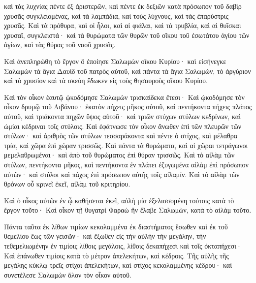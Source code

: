 {καὶ τὰς λυχνίας πέντε ἐξ ἀριστερῶν, καὶ πέντε ἐκ δεξιῶν κατὰ πρόσωπον τοῦ δαβὶρ χρυσᾶς συγκλειομένας, καὶ τὰ λαμπάδια, καὶ τοὺς λύχνους, καὶ τὰς ἐπαρύστρις χρυσᾶς.
Καὶ τὰ πρόθυρα, καὶ οἱ ἧλοι, καὶ αἱ φιάλαι, καὶ τὰ τρυβλία, καὶ αἱ θυΐσκαι χρυσαῖ, συγκλειστά· καὶ τὰ θυρώματα τῶν θυρῶν τοῦ οἴκου τοῦ ἐσωτάτου ἁγίου τῶν ἁγίων, καὶ τὰς θύρας τοῦ ναοῦ χρυσᾶς.
\par }{\PP {}Καὶ ἀνεπληρώθη τὸ ἔργον ὃ ἐποίησε Σαλωμὼν οἴκου Κυρίου· καὶ εἰσήνεγκε Σαλωμὼν τὰ ἅγια Δαυὶδ τοῦ πατρὸς αὐτοῦ, καὶ πάντα τὰ ἅγια Σαλωμὼν, τὸ ἀργύριον καὶ τὸ χρυσίον καὶ τὰ σκεύη ἔδωκεν εἰς τοὺς θησαυροὺς οἴκου Κυρίου.
\par }{\PP {}Καὶ τὸν οἶκον ἑαυτῷ ᾠκοδόμησε Σαλωμὼν τρισκαίδεκα ἔτεσι·
Καὶ ᾠκοδόμησε τὸν οἶκον δρυμῷ τοῦ Λιβάνου· ἑκατὸν πήχεις μῆκος αὐτοῦ, καὶ πεντήκοντα πήχεις πλάτος αὐτοῦ, καὶ τριάκοντα πηχῶν ὕψος αὐτοῦ· καὶ τριῶν στύχων στύλων κεδρίνων, καὶ ὠμίαι κέδριναι τοῖς στύλοις.
Καὶ ἐφάτνωσε τὸν οἶκον ἄνωθεν ἐπὶ τῶν πλευρῶν τῶν στύλων· καὶ ἀριθμὸς τῶν στύλων τεσσαράκοντα καὶ πέντε ὁ στίχος,
καὶ μέλαθρα τρία, καὶ χῶρα ἐπὶ χώραν τρισσῶς.
Καὶ πάντα τὰ θυρώματα, καὶ αἱ χῶραι τετράγωνοι μεμελαθρωμέναι· καὶ ἀπὸ τοῦ θυρώματος ἐπὶ θύραν τρισσῶς.
Καὶ τὸ αἰλὰμ τῶν στύλων, πεντήκοντα μῆκος, καὶ πεντήκοντα ἐν πλάτει ἐζυγωμένα αἰλὰμ ἐπὶ πρόσωπον αὐτῶν· καὶ στύλοι καὶ πάχος ἐπὶ πρόσωπον αὐτῆς τοῖς αἰλαμίν.
Καὶ τὸ αἰλὰμ τῶν θρόνων οὗ κρινεῖ ἐκεῖ, αἰλὰμ τοῦ κριτηρίου.
\par }{\PP {}Καὶ ὁ οἶκος αὐτῶν ἐν ᾧ καθήσεται ἐκεῖ, αὐλὴ μία ἐξελισσομένη τούτοις κατὰ τὸ ἔργον τοῦτο· Καὶ οἶκον τῇ θυγατρὶ Φαραὼ ἣν ἔλαβε Σαλωμὼν, κατὰ τὸ αἰλὰμ τοῦτο.
\par }{\PP {}Πάντα ταῦτα ἐκ λίθων τιμίων κεκολαμμένα ἐκ διαστήματος ἔσωθεν καὶ ἐκ τοῦ θεμελίου ἕως τῶν γεισῶν· καὶ ἔξωθεν εἰς τὴν αὐλὴν τὴν μεγάλην,
τὴν τεθεμελιωμένην ἐν τιμίοις λίθοις μεγάλοις, λίθοις δεκαπήχεσι καὶ τοῖς ὀκταπήχεσι·
Καὶ ἐπάνωθεν τιμίοις κατὰ τὸ μέτρον ἀπελεκήτων, καὶ κέδροις.
Τῆς αὐλῆς τῆς μεγάλης κύκλῳ τρεῖς στίχοι ἀπελεκήτων, καὶ στίχος κεκολαμμένης κέδρου·
καὶ συνετέλεσε Σαλωμὼν ὅλον τὸν οἶκον αὐτοῦ.

}

